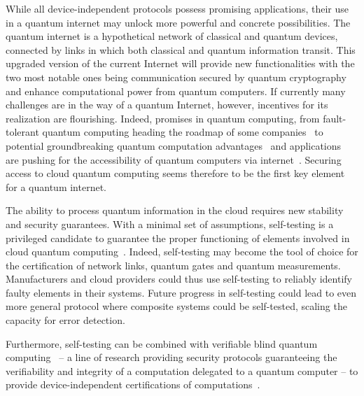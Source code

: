 While all device-independent protocols possess promising applications, their use in a quantum internet may unlock more powerful and concrete possibilities.
The quantum internet is a hypothetical network of classical and quantum devices, connected by links in which both classical and quantum information transit.
This upgraded version of the current Internet will provide new functionalities with the two most notable ones being communication secured by quantum cryptography and enhance computational power from quantum computers.
If currently many challenges are in the way of a quantum Internet, however, incentives for its realization are flourishing.
Indeed, promises in quantum computing, from fault-tolerant quantum computing heading the roadmap of some companies~\cite{Google2022,Intel2022,IBM2022} to potential groundbreaking quantum computation advantages~\cite{Deutsch1992,Shor1994,Grover1996} and applications~\cite{Bauer2020,Paudel2022} are pushing for the accessibility of quantum computers via internet~\cite{Rietsche2022}.
Securing access to cloud quantum computing seems therefore to be the first key element for a quantum internet.

\medbreak

The ability to process quantum information in the cloud requires new stability and security guarantees.
With a minimal set of assumptions, self-testing is a privileged candidate to guarantee the proper functioning of elements involved in cloud quantum computing~\cite{Sekatski2018}.
Indeed, self-testing may become the tool of choice for the certification of network links, quantum gates and quantum measurements.
Manufacturers and cloud providers could thus use self-testing to reliably identify faulty elements in their systems.
Future progress in self-testing could lead to even more general protocol where composite systems could be self-tested, scaling the capacity for error detection.

Furthermore, self-testing can be combined with verifiable blind quantum computing~\cite{Fitzsimons2017,Eisert2020} -- a line of research providing security protocols guaranteeing the verifiability and integrity of a computation delegated to a quantum computer -- to provide device-independent certifications of computations~\cite{Reichardt2013,Gheorghiu2015,Hajdusek2015,McKague2016}.

\medbreak

